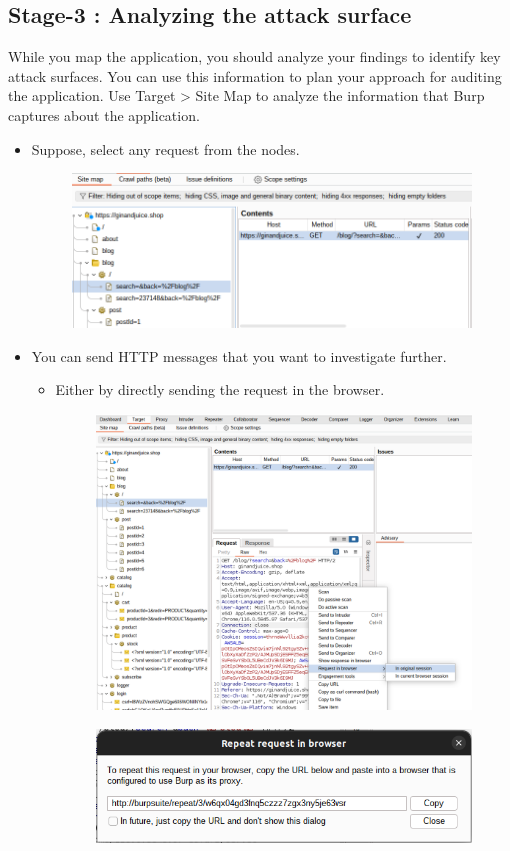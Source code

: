 \documentclass[
	a4paper, %
	12pt, %
]{CSSullivanBusinessReport}
\begin{document}
\subsection*{Stage-3 : Analyzing the attack surface }
\begin{fullwidth}
    While you map the application, you should analyze your findings to identify key attack surfaces. You can use this information to plan your approach for auditing the application. Use Target > Site Map to analyze the information that Burp captures about the application.
    \begin{itemize}
        \item Suppose, select any request from the nodes. 
        \begin{figure}[H]
            \centering
            \includegraphics[width=0.5\linewidth]{Images//Mapping/select Request.png}
            
            
        \end{figure}
        \item You can send HTTP messages that you want to investigate further.
        \begin{itemize}
            \item Either by directly sending the request in the browser.
\begin{figure}[H]
    \centering
    \includegraphics[width=0.5\linewidth]{Images//Mapping/request_browser.png}
    
    
\end{figure}
\begin{figure}[H]
    \centering
    \includegraphics[width=0.5\linewidth]{Images//Mapping/request_browser2.png}
    

\end{figure}
\end{itemize}
\end{itemize}
\end{fullwidth}
\end{document}

